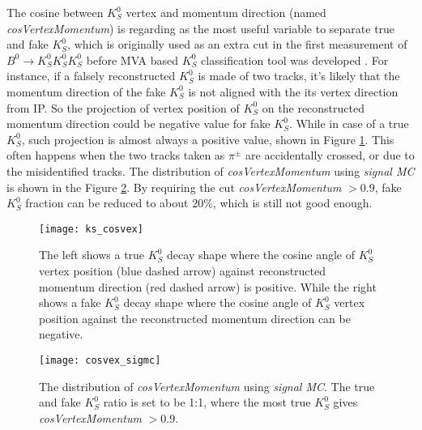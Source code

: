 The cosine between $K_S^0$ vertex and momentum direction (named \textit{cosVertexMomentum}) is regarding as the most useful variable to separate true and fake $K_S^0$, which is originally used as an extra cut in the first measurement of $B^0 \to K_S^0  K_S^0  K_S^0$ before MVA based $K_S^0$ classification tool was developed \cite{Sumisawa_2005}. For instance, if a falsely reconstructed $K_S^0$ is made of two tracks, it's likely that the momentum direction of the fake $K_S^0$ is not aligned with the its vertex direction from IP. So the projection of vertex position of $K_S^0$ on the reconstructed momentum direction could be negative value for fake $K_S^0$. While in case of a true $K_S^0$, such projection is almost always a positive value, shown in Figure \ref{fig:ks_cosvex}. This often happens when the two tracks taken as $\pi^{\pm}$ are accidentally crossed, or due to the misidentified tracks. The distribution of \textit{cosVertexMomentum} using \textit{signal MC} is shown in the Figure \ref{fig:cosvex_sigmc}. By requiring the cut \textit{cosVertexMomentum} $>0.9$, fake $K_S^0$ fraction can be reduced to about 20\%, which is still not good enough.


\begin{figure}[htbp]
	\centering
	\texttt{[image: ks\_cosvex]}
	\caption{The left shows a true $K_S^0$ decay shape where the cosine angle of $K_S^0$ vertex position (blue dashed arrow) against reconstructed momentum direction (red dashed arrow) is positive. While the right shows a fake $K_S^0$ decay shape where the cosine angle of $K_S^0$ vertex position against the reconstructed momentum direction can be negative. }
	\label{fig:ks_cosvex}
\end{figure}

\begin{figure}[htbp]
	\centering
	\texttt{[image: cosvex\_sigmc]}
	\caption{The distribution of \textit{cosVertexMomentum} using \textit{signal MC}. The true and fake $K_S^0$ ratio is set to be 1:1, where the most true $K_S^0$ gives  \textit{cosVertexMomentum} $>0.9$.}
	\label{fig:cosvex_sigmc}
\end{figure}

